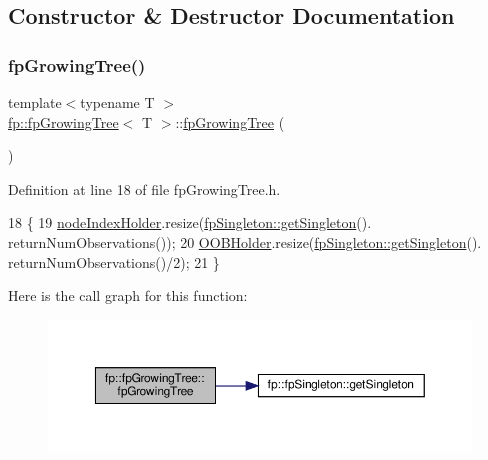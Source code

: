 \subsection{Constructor \& Destructor Documentation}
\mbox{\label{classfp_1_1fpGrowingTree_a7704cdb870c23913b5247de052f2c635}} 
\subsubsection{\texorpdfstring{fp\+Growing\+Tree()}{fpGrowingTree()}}
{\footnotesize\ttfamily template$<$typename T $>$ \\
\hyperlink{classfp_1_1fpGrowingTree}{fp\+::fp\+Growing\+Tree}$<$ T $>$\+::\hyperlink{classfp_1_1fpGrowingTree}{fp\+Growing\+Tree} (\begin{DoxyParamCaption}{ }\end{DoxyParamCaption})\hspace{0.3cm}{\ttfamily [inline]}}



Definition at line 18 of file fp\+Growing\+Tree.\+h.


\begin{DoxyCode}
18                                \{
19             \hyperlink{classfp_1_1fpGrowingTree_ad729a18d4cd23d38a5bcab4bdd1ed58b}{nodeIndexHolder}.resize(\hyperlink{classfp_1_1fpSingleton_a8bdae77b68521003e3fc630edec2e240}{fpSingleton::getSingleton}().
      returnNumObservations());    
20             \hyperlink{classfp_1_1fpGrowingTree_afdd5b18a4e4f282e3c5aba30caf918c0}{OOBHolder}.resize(\hyperlink{classfp_1_1fpSingleton_a8bdae77b68521003e3fc630edec2e240}{fpSingleton::getSingleton}().
      returnNumObservations()/2);  
21                 \}
\end{DoxyCode}
Here is the call graph for this function\+:
\nopagebreak
\begin{figure}[H]
\begin{center}
\leavevmode
\includegraphics[width=350pt]{classfp_1_1fpGrowingTree_a7704cdb870c23913b5247de052f2c635_cgraph}
\end{center}
\end{figure}


